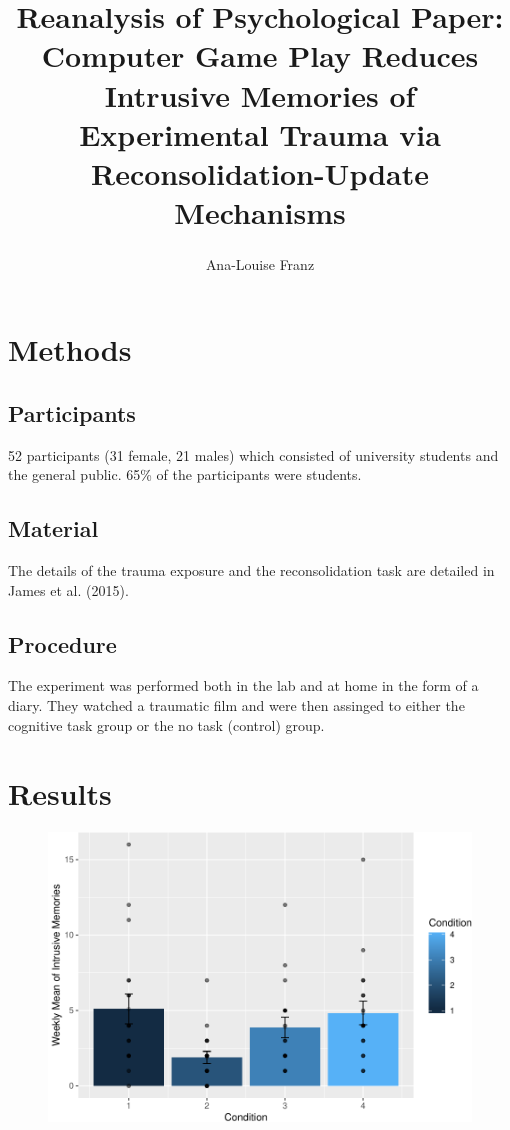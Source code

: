 \documentclass[man]{apa6}
\title{Reanalysis of Psychological Paper: Computer Game Play Reduces Intrusive
Memories of Experimental Trauma via Reconsolidation-Update Mechanisms}
\author{Ana-Louise Franz\textsuperscript{}}
\date{}
\affiliation{
\vspace{0.5cm}
\textsuperscript{1} Brooklyn College}
\begin{document}
\maketitle

\section{Methods}\label{methods}

\subsection{Participants}\label{participants}

52 participants (31 female, 21 males) which consisted of university
students and the general public. 65\% of the participants were students.

\subsection{Material}\label{material}

The details of the trauma exposure and the reconsolidation task are
detailed in James et al. (2015).

\subsection{Procedure}\label{procedure}

The experiment was performed both in the lab and at home in the form of
a diary. They watched a traumatic film and were then assinged to either
the cognitive task group or the no task (control) group.

\section{Results}\label{results}

\begin{figure}
\centering
\includegraphics{Midterm_Paper_files/figure-latex/unnamed-chunk-1-1.pdf}
\caption{}
\end{figure}
\end{document}
